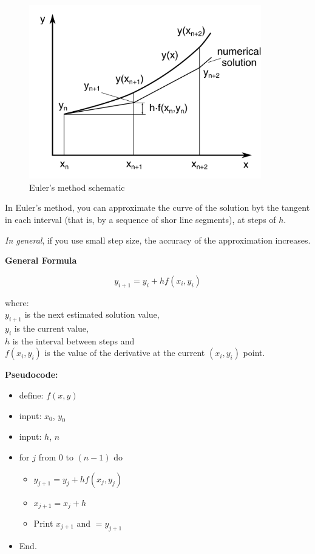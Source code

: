 \documentclass[10pt,b5paper,titlepage]{book}
\begin{document}
\begin{figure}[ht]
    \centering
    \includegraphics[width=0.90\textwidth]{img/Euler.png}
    \caption{Euler's method schematic}
    \label{fig:euler-png}
\end{figure}

In Euler's method, you can approximate the curve of the solution byt the tangent
in each interval (that is, by a sequence of shor line segments), at steps of $ h $.

\textit{In general}, if you use small step size, the accuracy of the approximation
increases.

\textbf{General Formula}

\begin{equation}
    y_{i+1} = y_i + h f(x_i,y_i)
\end{equation}

where:\\
$ y_{i+1} $ is the next estimated solution value,\\
$ y_i $ is the current value,\\
$ h $ is the interval between steps and\\
$ f(x_i,y_i) $ is the value of the derivative at the current $ (x_i,y_i) $ point.

\textbf{Pseudocode:}

\begin{itemize}
    \item define: $ f(x,y) $

    \item input: $ x_0 $, $ y_0 $

    \item input: $ h $, $ n $

    \item for $ j $ from $ 0 $ to $ (n-1) $ do
        \begin{itemize}
            \item $ y_{j+1} = y_j + hf(x_j, y_j) $
            \item $ x_{j+1} = x_j + h $
            \item Print $ x_{j+1} $ and $= y_{j+1} $
        \end{itemize}
    \item End.
\end{itemize}
\end{document}
